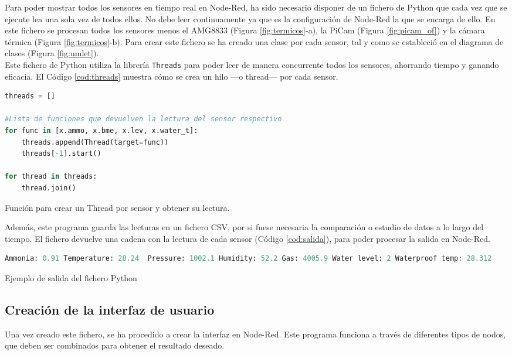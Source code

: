Para poder mostrar todos los sensores en tiempo real en Node-Red, ha sido necesario disponer de un fichero de Python que cada vez que se ejecute lea una sola vez de todos ellos. No debe leer continuamente ya que es la configuración de Node-Red la que se encarga de ello. En este fichero se procesan todos los sensores menos el AMG8833 (Figura \ref{fig:termicos}-a), la PiCam (Figura \ref{fig:picam_of}) y la cámara térmica (Figura \ref{fig:termicos}-b). Para crear este fichero se ha creado una clase por cada sensor, tal y como se estableció en el diagrama de clases (Figura \ref{fig:umlet}).\\

Este fichero de Python utiliza la librería \verb|Threads| para poder leer de manera concurrente todos los sensores, ahorrando tiempo y ganando eficacia. El Código \ref{cod:threads} muestra cómo se crea un hilo ---o thread--- por cada sensor.\\
\begin{code}[h]
\begin{lstlisting}[language=Python]
threads = []

#Lista de funciones que devuelven la lectura del sensor respectivo
for func in [x.ammo, x.bme, x.lev, x.water_t]: 
	threads.append(Thread(target=func))
	threads[-1].start()
	
for thread in threads:
	thread.join()
\end{lstlisting}
\caption[Función para crear un Thread por sensor y obtener su lectura.]{Función para crear un Thread por sensor y obtener su lectura.}
\label{cod:threads}
\end{code}

Además, este programa guarda las lecturas en un fichero CSV, por si fuese necesaria la comparación o estudio de datos a lo largo del tiempo. El fichero devuelve una cadena con la lectura de cada sensor (Código \ref{cod:salida}), para poder procesar la salida en Node-Red.\\
\begin{code}[h]
\begin{lstlisting}[language=Python]
Ammonia: 0.91 Temperature: 28.24  Pressure: 1002.1 Humidity: 52.2 Gas: 4005.9 Water level: 2 Waterproof temp: 28.312
\end{lstlisting}
\caption[Ejemplo de salida del fichero Python]{Ejemplo de salida del fichero Python}
\label{cod:salida}
\end{code}

\subsection{Creación de la interfaz de usuario}
\label{sec:IU}
Una vez creado este fichero, se ha procedido a crear la interfaz en Node-Red. Este programa funciona a través de diferentes tipos de nodos, que deben ser combinados para obtener el resultado deseado.\\

